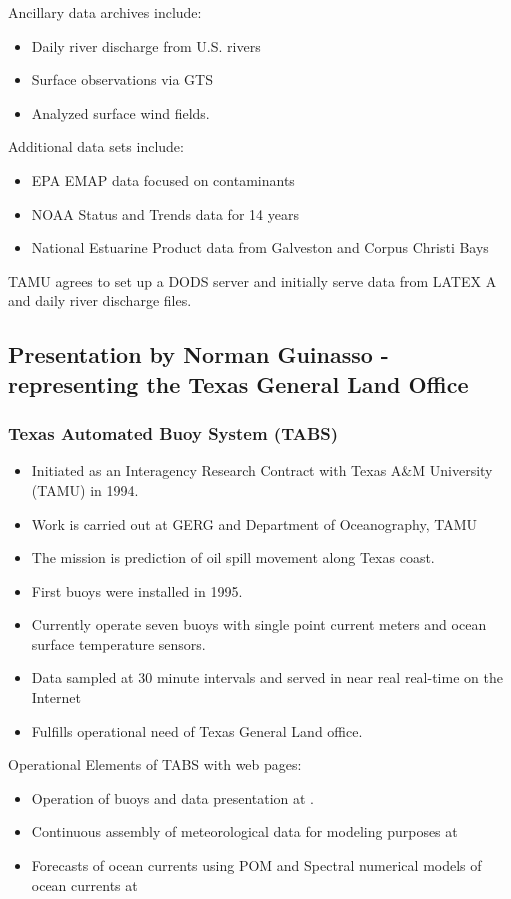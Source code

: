 Ancillary data archives include:
\begin{itemize}
\item Daily river discharge from U.S. rivers
\item Surface observations via GTS
\item Analyzed surface wind fields.
\end{itemize}

Additional data sets include:
\begin{itemize}
\item EPA EMAP data focused on contaminants
\item NOAA Status and Trends data for 14 years
\item National Estuarine Product data from Galveston and Corpus
Christi Bays
\end{itemize}

TAMU agrees to set up a DODS server and initially serve data from LATEX A and daily river 
discharge files.

\subsection{Presentation by Norman Guinasso - representing the Texas General Land Office}


\subsubsection{Texas Automated Buoy System (TABS)}

\begin{itemize}
\item Initiated as an Interagency Research Contract with Texas A\&M University (TAMU) in 1994.
\item Work is carried out at GERG and Department of Oceanography, TAMU
\item The mission is prediction of oil spill movement along Texas
coast.
\item First buoys were installed in 1995.
\item Currently operate seven buoys with single point current meters and ocean surface 
temperature sensors.
\item Data sampled at 30 minute intervals and served in near real real-time on the Internet  
\item Fulfills operational need of Texas General Land office.
\end{itemize}

Operational Elements of TABS with web pages:
\begin{itemize}
\item Operation of buoys and data presentation at .
\item Continuous assembly of meteorological data for modeling purposes
  at 

\item Forecasts of ocean currents using POM and Spectral numerical
models of ocean currents at 
\end{itemize}

